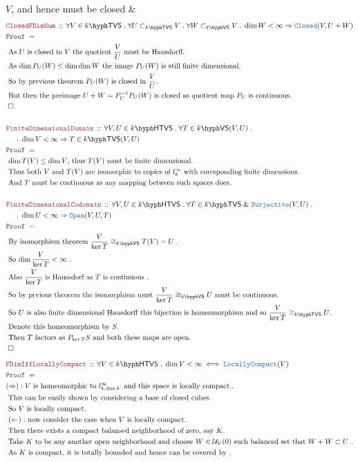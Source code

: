 \documentclass[12pt]{scrartcl}
\newcommand{\TYPE}[1]{\textcolor{NavyBlue}{\mathtt{#1}}}
\newcommand{\LOGIC}[1]{\textcolor{Blue}{\mathtt{#1}}}
\newcommand{\THM}[1]{\textcolor{Maroon}{\mathtt{#1}}}
\renewcommand{\.}{\; . \;}
\newcommand{\Theorem}[2]{& \THM{#1} \, :: \, #2 \\ & \Proof = \\ }
\newcommand{\NewLine}{\\ & \kern 1pc}
\newcommand{\Page}[1]{ \begin{align*} #1 \end{align*}   }
\newcommand{\Explain}[1]{& \text{#1.} \\}
\renewcommand{\And}{\; \& \;}
\newcommand{\Imply}{\Rightarrow}
\newcommand{\Surj}{\TYPE{Surjective}}
\newcommand{\QED}{\; \square}
\newcommand{\EndProof}{& \QED \\}
\newcommand{\Proof}{\LOGIC{Proof} \; }
\newcommand{\Open}{\TYPE{Open}}
\newcommand{\Closed}{\TYPE{Closed}}
\renewcommand{\U}{\mathcal{U}}
\newcommand{\subvec}[1]{\subset_{\VS{#1}}}%
\newcommand{\VS}[1]{#1\hyph\mathsf{VS}} %
\newcommand{\TVS}[1]{{#1}\hyph\mathsf{TVS}}
\newcommand{\HTVS}[1]{{#1}\hyph\mathsf{HTVS}}
\begin{document}
{{		$V$, and hence must be closed}
	\EndProof
}\Page{
	\Theorem{ClosedFDimSum}
	{
		\forall V \in \TVS{k} \.
		\forall U \subset_{\TVS{k}} V \.
		\forall W \subvec{k} V \.
		\dim W < \infty \Imply \Closed(V,U + W)
	}
	\Explain{ 
		As $U$ is closed in $V$ the quotient $\frac{V}{U}$ must be Hausdorff}
	\Explain{ 
		As $\dim P_U(W) \le \dim \dim W$ the image $P_U(W)$ is still finite dimensional}
	\Explain{ 
		So by previous theorem $P_U(W)$ is closed in $\frac{V}{U}$}
	\Explain{ But then the preimage $ U + W  = P^{-1}_U P_U(W)$
		is closed as quotient map  $P_U$ is continuous}
	\EndProof
	\\
	\Theorem{FiniteDimensionalDomain}
	{
		\forall V,U \in \HTVS{k} \.
		\forall T \in \VS{k}(V,U) \. \NewLine \.
		\dim V < \infty  \Imply 
		T \in \TVS{k}(V,U)
	}
	\Explain{
		$\dim T(V) \le \dim V$, thus $T(V)$ must be finite dimensional}
	\Explain{
		Thus both $V$ and $T(V)$ are isomorphic to copies of 
		$l^\infty_k$ with coresponding finite dimensions}
	\Explain{
		And $T$ must be continuous as any mapping between such spaces does}
	\\
	\Theorem{FiniteDimensionalCodomain}
	{
		\forall V,U \in \HTVS{k} \.
		\forall T \in \TVS{k} \And \Surj(V,U) \. \NewLine \.
		\dim U < \infty  \Imply 
		\Open(V,U,T)
	}
	\Explain{
		By isomorphism theorem
		$\frac{V}{\ker T} \cong_{\VS{k}} T(V) = U$ 
	}
	\Explain{
		So $\dim \frac{V}{\ker T} < \infty$
	}
	\Explain{
		Also $\frac{V}{\ker T} $ is Haussdorf as $T$ is continuous
	}
	\Explain{
		So by prvious theorem the isomorphism must 
		$\frac{V}{\ker T} \cong_{\VS{k}} U$ must be continuous}
	\Explain{
		So $U$ is also finite dimensional Hausdorff  this bijection is homeomorphism 
		and so $\frac{V}{\ker T} \cong_{\TVS{k}} U$}
	\Explain{
		Denote this homeomorphism by $S$}
	\Explain{
		Then $T$ factors as $P_{\ker T} S$ and both these maps are open}
	\EndProof
}\Page{
	\Theorem{FDimIffLocallyCompact}
	{
		\forall V \in \HTVS{k} \.
		\dim V < \infty 
		\iff
		\TYPE{LocallyCompact}(V)
	}
	\Explain{$(\Rightarrow): V$ is homeomorphic to $l^{\infty}_{k,\dim V}$
		and this space is locally compact.}
	\Explain{
		This can be easily shown by considering a base of closed cubes}
	\Explain{
		So $V$ is locally compact}
	\Explain{
		$(\Leftarrow):$ now consider the case when $V$ is locally compact}
	\Explain{
		Then there exists a compact balansed neighborhood of zero, say $K$}
	\Explain{
		Take $K$ to be any another open neighborhood and choose
		$W \in \U_V(0)$ such balanced set that $W+W \subset U$
	}
	\Explain{
		As $K$ is compact, it is totally bounded and hence can be covered by
}}
\end{document}
